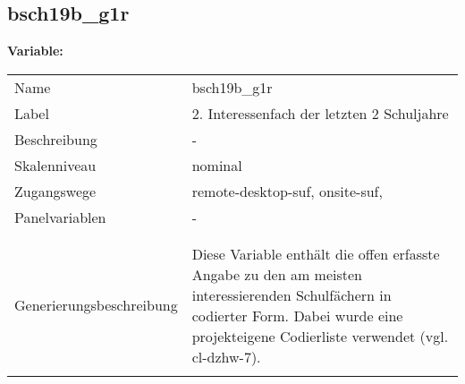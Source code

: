 	
	
	\subsection{bsch19b\_g1r}
	\label{subSection:bsch19b_g1r}

	\noindent\textbf{Variable:}\\
		\begin{tabular}{lL{11.3cm}}
			\label{tableVariable:bsch19b_g1r}
			Name & bsch19b\_g1r \\
			Label & 2. Interessenfach der letzten 2 Schuljahre \\
			Beschreibung & - \\
			Skalenniveau & nominal \\
			Zugangswege &
				remote-desktop-suf,
				onsite-suf,
 \\
			Panelvariablen & -
			 \\
			 \\
 \\
					Generierungsbeschreibung & Diese Variable enthält die offen erfasste Angabe zu den am meisten interessierenden Schulfächern in codierter Form. Dabei wurde eine projekteigene Codierliste verwendet (vgl. cl-dzhw-7).
				 \\	
			 \\
		\end{tabular}






